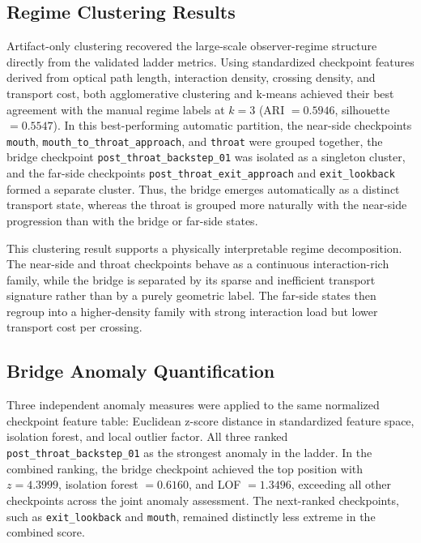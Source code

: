 \documentclass[11pt]{article}
\begin{document}
\subsection{Regime Clustering Results}

Artifact-only clustering recovered the large-scale observer-regime structure directly from the validated ladder metrics. Using standardized checkpoint features derived from optical path length, interaction density, crossing density, and transport cost, both agglomerative clustering and k-means achieved their best agreement with the manual regime labels at $k = 3$ (ARI $= 0.5946$, silhouette $= 0.5547$). In this best-performing automatic partition, the near-side checkpoints \texttt{mouth}, \texttt{mouth\_to\_throat\_approach}, and \texttt{throat} were grouped together, the bridge checkpoint \texttt{post\_throat\_backstep\_01} was isolated as a singleton cluster, and the far-side checkpoints \texttt{post\_throat\_exit\_approach} and \texttt{exit\_lookback} formed a separate cluster. Thus, the bridge emerges automatically as a distinct transport state, whereas the throat is grouped more naturally with the near-side progression than with the bridge or far-side states.

This clustering result supports a physically interpretable regime decomposition. The near-side and throat checkpoints behave as a continuous interaction-rich family, while the bridge is separated by its sparse and inefficient transport signature rather than by a purely geometric label. The far-side states then regroup into a higher-density family with strong interaction load but lower transport cost per crossing.

\subsection{Bridge Anomaly Quantification}

Three independent anomaly measures were applied to the same normalized checkpoint feature table: Euclidean z-score distance in standardized feature space, isolation forest, and local outlier factor. All three ranked \texttt{post\_throat\_backstep\_01} as the strongest anomaly in the ladder. In the combined ranking, the bridge checkpoint achieved the top position with $z = 4.3999$, isolation forest $= 0.6160$, and LOF $= 1.3496$, exceeding all other checkpoints across the joint anomaly assessment. The next-ranked checkpoints, such as \texttt{exit\_lookback} and \texttt{mouth}, remained distinctly less extreme in the combined score.
\end{document}
